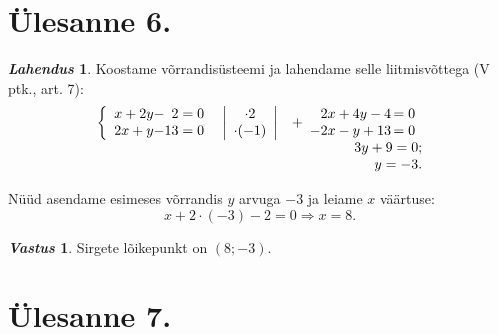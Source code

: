 \documentclass[a4paper,fleqn,12pt]{article}
\theoremstyle{definition}
\newtheorem*{solution}{\indent\textmd{\emph{Lahendus}}}
\newtheorem*{answer}{\indent\textmd{\emph{Vastus}}}
\begin{document}
\weekDays
\section{Ülesanne 6.}

\begin{solution}
Koostame võrrandisüsteemi ja lahendame selle liitmisvõttega (V ptk., art. 7):
\begin{displaymath}
\begin{array}{rr}
	\left\{
	\begin{array}{*{3}{r@{}}}
	 x + 2y&-&2=0  \\
	2x + y&-&13=0
	\end{array}
	\right.

	\quad

	\left|
		\begin{array}{c}
		\cdot2\\
		\cdot(-1) 
		\end{array}
	\right|&
	+
	\begin{array}{r@{\,}l}
		2x+4y-4 &=0\\
		-2x-y+13&=0
	\end{array} 
	\\
	& 3y+9=0;\\
	& y=-3.
\end{array}
\end{displaymath}

\end{solution}

Nüüd asendame esimeses võrrandis $y$ arvuga $-3$ ja leiame $x$ väärtuse:
\begin{displaymath}
x+2\cdot(-3)-2=0 \Rightarrow x=8.
\end{displaymath}

\begin{answer}
Sirgete lõikepunkt on $(8; -3)$.
\end{answer}
\section{Ülesanne 7.}

\subsection*{}
\end{document}

